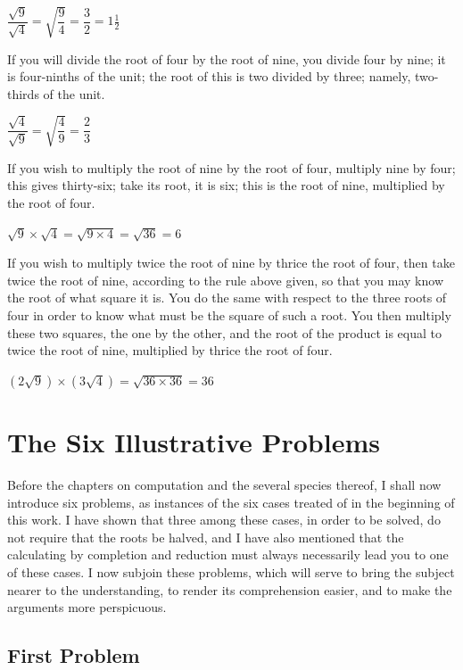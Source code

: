 \documentclass[11pt,a4paper]{book}
\begin{document}
$\dfrac{\sqrt{9}}{\sqrt{4}} = \sqrt{\dfrac{9}{4}} = \dfrac{3}{2} = 1\tfrac{1}{2}$

If you will divide the root of four by the root of nine, you divide four by
nine; it is four-ninths of the unit; the root of this is two divided by
three; namely, two-thirds of the unit.

$\dfrac{\sqrt{4}}{\sqrt{9}} = \sqrt{\dfrac{4}{9}} = \dfrac{2}{3}$

If you wish to multiply the root of nine by the root of four, multiply nine
by four; this gives thirty-six; take its root, it is six; this is the root
of nine, multiplied by the root of four.

$\sqrt{9} \times \sqrt{4} = \sqrt{9 \times 4} = \sqrt{36} = 6$

If you wish to multiply twice the root of nine by thrice the root of four,
then take twice the root of nine, according to the rule above given, so that
you may know the root of what square it is. You do the same with respect to
the three roots of four in order to know what must be the square of such a
root. You then multiply these two squares, the one by the other, and the root
of the product is equal to twice the root of nine, multiplied by thrice the
root of four.

$(2\sqrt{9}) \times (3\sqrt{4}) = \sqrt{36 \times 36} = 36$

\newpage

\chapter{The Six Illustrative Problems}
\label{ch:six-problems}

Before the chapters on computation and the several species thereof, I shall
now introduce six problems, as instances of the six cases treated of in the
beginning of this work. I have shown that three among these cases, in order
to be solved, do not require that the roots be halved, and I have also
mentioned that the calculating by completion and reduction must always
necessarily lead you to one of these cases. I now subjoin these problems,
which will serve to bring the subject nearer to the understanding, to render
its comprehension easier, and to make the arguments more perspicuous.

\section*{First Problem}
\end{document}
